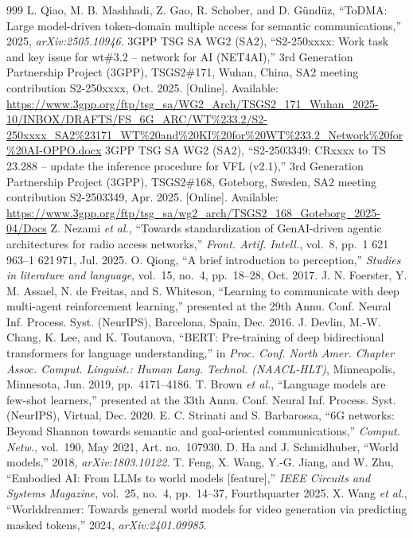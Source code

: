 \begin{thebibliography}{999}
 L. Qiao, M. B. Mashhadi, Z. Gao, R. Schober, and D. Gündüz, ``ToDMA: Large model-driven token-domain multiple access for semantic communications,'' 2025, \emph{arXiv:2505.10946}.
 3GPP TSG SA WG2 (SA2), ``S2-250xxxx: Work task and key issue for wt\#3.2 -- network for AI (NET4AI),'' 3rd Generation Partnership Project (3GPP), TSGS2\#171, Wuhan, China, SA2 meeting contribution S2-250xxxx, Oct. 2025. [Online]. Available: \url{https://www.3gpp.org/ftp/tsg_sa/WG2_Arch/TSGS2_171_Wuhan_2025-10/INBOX/DRAFTS/FS_6G_ARC/WT\%233.2/S2-250xxxx_SA2\%23171_WT\%20and\%20KI\%20for\%20WT\%233.2_Network\%20for\%20AI-OPPO.docx}
 3GPP TSG SA WG2 (SA2), ``S2-2503349: CRxxxx to TS 23.288 -- update the inference procedure for VFL (v2.1),'' 3rd Generation Partnership Project (3GPP), TSGS2\#168, Goteborg, Sweden, SA2 meeting contribution S2-2503349, Apr. 2025. [Online]. Available: \url{https://www.3gpp.org/ftp/tsg_sa/wg2_arch/TSGS2_168_Goteborg_2025-04/Docs}
 Z. Nezami \emph{et al.}, ``Towards standardization of GenAI-driven agentic architectures for radio access networks,'' \emph{Front. Artif. Intell.}, vol.~8, pp.~1 621\,963--1 621\,971, Jul. 2025.
 O. Qiong, ``A brief introduction to perception,'' \emph{Studies in literature and language}, vol.~15, no.~4, pp.~18--28, Oct. 2017.
 J. N. Foerster, Y. M. Assael, N. de Freitas, and S. Whiteson, ``Learning to communicate with deep multi-agent reinforcement learning,'' presented at the 29th Annu. Conf. Neural Inf. Process. Syst. (NeurIPS), Barcelona, Spain, Dec. 2016.
 J. Devlin, M.-W. Chang, K. Lee, and K. Toutanova, ``BERT: Pre-training of deep bidirectional transformers for language understanding,'' in \emph{Proc. Conf. North Amer. Chapter Assoc. Comput. Linguist.: Human Lang. Technol. (NAACL-HLT)}, Minneapolis, Minnesota, Jun. 2019, pp.~4171--4186.
 T. Brown \emph{et al.}, ``Language models are few-shot learners,'' presented at the 33th Annu. Conf. Neural Inf. Process. Syst. (NeurIPS), Virtual, Dec. 2020.
 E. C. Strinati and S. Barbarossa, ``6G networks: Beyond Shannon towards semantic and goal-oriented communications,'' \emph{Comput. Netw.}, vol.~190, May 2021, Art. no.~107930.
 D. Ha and J. Schmidhuber, ``World models,'' 2018, \emph{arXiv:1803.10122}.
 T. Feng, X. Wang, Y.-G. Jiang, and W. Zhu, ``Embodied AI: From LLMs to world models [feature],'' \emph{IEEE Circuits and Systems Magazine}, vol.~25, no.~4, pp.~14--37, Fourthquarter 2025.
 X. Wang \emph{et al.}, ``Worlddreamer: Towards general world models for video generation via predicting masked tokens,'' 2024, \emph{arXiv:2401.09985}.

\end{thebibliography}
